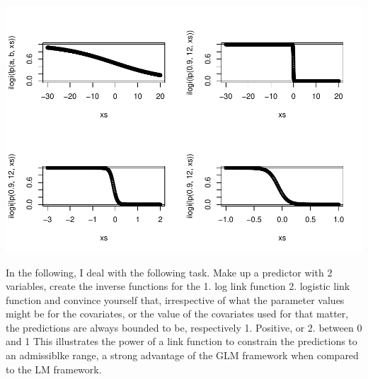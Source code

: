 \documentclass[
]{book}
\begin{document}
\includegraphics{ECOMODbook_files/figure-latex/links2-1.pdf}

In the following, I deal with the following task. Make up a predictor with 2 variables, create the inverse functions for the
1. log link function
2. logistic link function
and convince yourself that, irrespective of what the parameter values might be for the covariates, or the value of the covariates used for that matter, the predictions are always bounded to be, respectively
1. Positive, or
2. between 0 and 1
This illustrates the power of a link function to constrain the predictions to an admissiblke range, a strong advantage of the GLM framework when compared to the LM framework.
\end{document}
